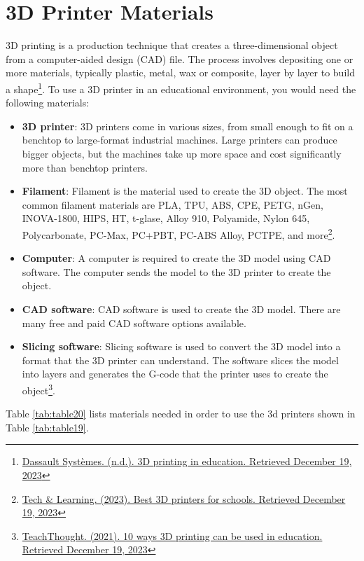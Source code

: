 \pagebreak
\hypertarget{d-printer-materials}{}\section{3D Printer Materials}\label{d-printer-materials}
3D printing is a production technique that creates a three-dimensional object from a computer-aided design (CAD) file. The process involves depositing one or more materials, typically plastic, metal, wax or composite, layer by layer to build a shape\footnote{\raggedright \href{http://www.3ds.com/make/solutions/industries/3d-printing-education}{Dassault Systèmes. (n.d.). 3D printing in education. Retrieved December 19, 2023}}. To use a 3D printer in an educational environment, you would need the following materials:

\begin{itemize}[leftmargin=*]
	\item \textbf{3D printer}: 3D printers come in various sizes, from small enough to fit on a benchtop to large-format industrial machines. Large printers can produce bigger objects, but the machines take up more space and cost significantly more than benchtop printers\footnotemark[\value{footnote}].
	\item \textbf{Filament}: Filament is the material used to create the 3D object. The most common filament materials are PLA, TPU, ABS, CPE, PETG, nGen, INOVA-1800, HIPS, HT, t-glase, Alloy 910, Polyamide, Nylon 645, Polycarbonate, PC-Max, PC+PBT, PC-ABS Alloy, PCTPE, and more\footnote{\raggedright \href{http://www.techlearning.com/buying-guides/best-3d-printers-for-schools}{Tech \& Learning. (2023). Best 3D printers for schools. Retrieved December 19, 2023}}.
	\item \textbf{Computer}: A computer is required to create the 3D model using CAD software. The computer sends the model to the 3D printer to create the object.
	\item \textbf{CAD software}: CAD software is used to create the 3D model. There are many free and paid CAD software options available.
	\item \textbf{Slicing software}: Slicing software is used to convert the 3D model into a format that the 3D printer can understand. The software slices the model into layers and generates the G-code that the printer uses to create the object\footnote{\raggedright \href{http://www.teachthought.com/technology/ways-3d-printing-can-be-used-in-education/}{TeachThought. (2021). 10 ways 3D printing can be used in education. Retrieved December 19, 2023}}.
\end{itemize}
Table \ref{tab:table20} lists materials needed in order to use the 3d printers shown in Table \ref{tab:table19}.

